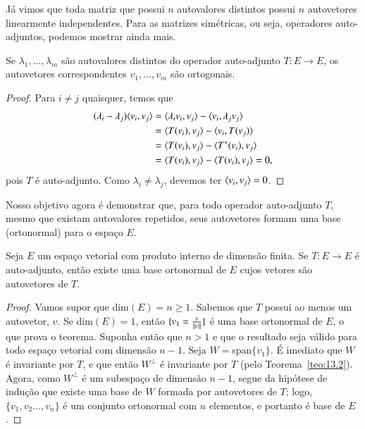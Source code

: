 Já vimos que toda matriz que possui $n$ autovalores distintos possui $n$ autovetores linearmente independentes. Para as matrizes simétricas, ou seja, operadores auto-adjuntos, podemos mostrar ainda mais.

\begin{teo}\label{teo:13.4}
  Se $\lambda_1,\ldots,\lambda_m$ são autovalores distintos do operador auto-adjunto $T:E\rightarrow E$, os autovetores correspondentes $v_1,\ldots,v_m$ são ortogonais.
\end{teo}
\begin{proof}
Para $i\ne j$ quaisquer, temos que
\begin{align*}
  (\lambda_i-\lambda_j)\langle v_i, v_j \rangle &= \langle \lambda_i v_i, v_j \rangle - \langle v_i, \lambda_jv_j \rangle \\
  &= \langle T(v_i), v_j \rangle - \langle v_i, T(v_j) \rangle\\
  &= \langle T(v_i), v_j \rangle - \langle T^*(v_i), v_j \rangle\\ 
  &= \langle T(v_i), v_j \rangle - \langle T(v_i), v_j \rangle = 0,
\end{align*}
pois $T$ é auto-adjunto. Como $\lambda_i \ne \lambda_j$, devemos ter $\langle v_i, v_j \rangle = 0$.
\end{proof}

Nosso objetivo agora é demonstrar que, para todo operador auto-adjunto $T$, mesmo que existam autovalores repetidos, seus autovetores formam uma base (ortonormal) para o espaço $E$.

\begin{teo}[Espectral] %
	Seja $E$ um espaço vetorial com produto interno de dimensão finita. Se $T:E\to E$ é auto-adjunto, então existe uma base ortonormal de $E$ cujos vetores são autovetores de $T$.
\end{teo}
\begin{proof}
	Vamos supor que dim$(E)=n\geq 1$. Sabemos que $T$ possui ao menos um autovetor, $v$. Se dim$(E)=1$, então $\{v_1=\frac{v}{\| v \|}\}$ é uma base ortonormal de $E$, o que prova o teorema. Suponha então que $n>1$ e que o resultado seja válido para todo espaço vetorial com dimensão $n-1$. Seja $W=$span$\{v_1\}$. É imediato que $W$ é invariante por $T$, e que então $W^\perp$ é invariante por $T$ (pelo Teorema~\ref{teo:13.2}). Agora, como $W^{\perp}$ é um subespaço de dimensão $n-1$, segue da hipótese de indução que existe uma base de $W$ formada por autovetores de $T$; logo, $\{v_1,v_2\ldots,v_n\}$ é um conjunto ortonormal com $n$ elementos, e portanto é base de $E$.
\end{proof}

